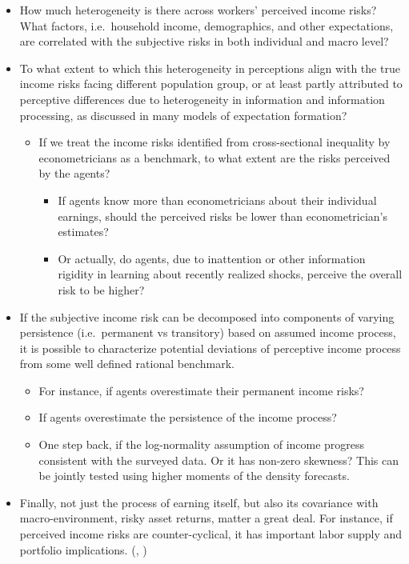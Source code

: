 \documentclass[12pt,notitlepage,onecolumn,aps,pra]{article}
\providecommand{\tightlist}{%
      \setlength{\itemsep}{0pt}\setlength{\parskip}{0pt}}
\begin{document}
\begin{itemize}
\item
  How much heterogeneity is there across workers' perceived income
  risks? What factors, i.e.~household income, demographics, and other
  expectations, are correlated with the subjective risks in both
  individual and macro level?
\item
  To what extent to which this heterogeneity in perceptions align with
  the true income risks facing different population group, or at least
  partly attributed to perceptive differences due to heterogeneity in
  information and information processing, as discussed in many models of
  expectation formation?

  \begin{itemize}
  \tightlist
  \item
    If we treat the income risks identified from cross-sectional
    inequality by econometricians as a benchmark, to what extent are the
    risks perceived by the agents?

    \begin{itemize}
    \tightlist
    \item
      If agents know more than econometricians about their individual
      earnings, should the perceived risks be lower than
      econometrician's estimates?
    \item
      Or actually, do agents, due to inattention or other information
      rigidity in learning about recently realized shocks, perceive the
      overall risk to be higher?
    \end{itemize}
  \end{itemize}
\item
  If the subjective income risk can be decomposed into components of
  varying persistence (i.e.~permanent vs transitory) based on assumed
  income process, it is possible to characterize potential deviations of
  perceptive income process from some well defined rational benchmark.

  \begin{itemize}
  \tightlist
  \item
    For instance, if agents overestimate their permanent income risks?
  \item
    If agents overestimate the persistence of the income process?
    \cite{rozsypal_overpersistence_2017}
  \item
    One step back, if the log-normality assumption of income progress
    consistent with the surveyed data. Or it has non-zero skewness? This
    can be jointly tested using higher moments of the density forecasts.
  \end{itemize}
\item
  Finally, not just the process of earning itself, but also its
  covariance with macro-environment, risky asset returns, matter a great
  deal. For instance, if perceived income risks are counter-cyclical, it
  has important labor supply and portfolio implications.
  (\cite{guvenen2014nature}, \cite{catherine_countercyclical_2019})
\end{itemize}
\end{document}
